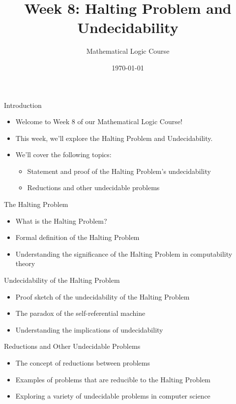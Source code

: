 \documentclass[presentation]{beamer}
\author{Mathematical Logic Course}
\date{\today}
\title{Week 8: Halting Problem and Undecidability}
\begin{document}
\maketitle

\begin{frame}[label={sec:orga5ca383}]{Introduction}
\begin{itemize}
\item Welcome to Week 8 of our Mathematical Logic Course!
\item This week, we'll explore the Halting Problem and Undecidability.
\item We'll cover the following topics:
\begin{itemize}
\item Statement and proof of the Halting Problem's undecidability
\item Reductions and other undecidable problems
\end{itemize}
\end{itemize}
\end{frame}

\begin{frame}[label={sec:orge5e22d0}]{The Halting Problem}
\begin{itemize}
\item What is the Halting Problem?
\item Formal definition of the Halting Problem
\item Understanding the significance of the Halting Problem in computability theory
\end{itemize}
\end{frame}

\begin{frame}[label={sec:org1569ae2}]{Undecidability of the Halting Problem}
\begin{itemize}
\item Proof sketch of the undecidability of the Halting Problem
\item The paradox of the self-referential machine
\item Understanding the implications of undecidability
\end{itemize}
\end{frame}

\begin{frame}[label={sec:org8449a90}]{Reductions and Other Undecidable Problems}
\begin{itemize}
\item The concept of reductions between problems
\item Examples of problems that are reducible to the Halting Problem
\item Exploring a variety of undecidable problems in computer science
\end{itemize}
\end{frame}
\end{document}
